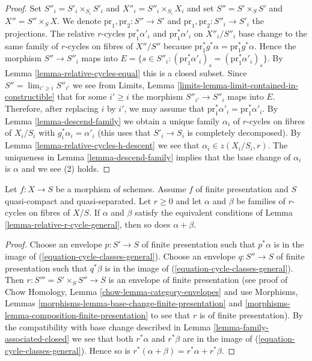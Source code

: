 \begin{proof}
\medskip\noindent
Set $S''_i = S'_i \times_{S_i} S'_i$ and $X''_i = S''_i \times_{S_i} X_i$
and set $S'' = S' \times_S S'$ and $X'' = S'' \times_S X$.
We denote $\text{pr}_1, \text{pr}_2 : S'' \to S'$ and
$\text{pr}_1, \text{pr}_2 : S''_i \to S'_i$ the projections.
The relative $r$-cycles $\text{pr}_1^*\alpha'_i$ and $\text{pr}_1^*\alpha'_i$
on $X''_i/S''_i$ base change to the same family of $r$-cycles
on fibres of $X''/S''$ because
$\text{pr}_1^*g^*\alpha = \text{pr}_1^*g^*\alpha$.
Hence the morphism $S'' \to S''_i$ maps into $E =
\{s \in S''_i : (\text{pr}_1^*\alpha'_i)_s = (\text{pr}_1^*\alpha'_i)_s\}$.
By Lemma \ref{lemma-relative-cycles-equal} this is a closed subset.
Since $S'' = \lim_{i' \geq i} S''_{i'}$ we see from
Limits, Lemma
\ref{limits-lemma-limit-contained-in-constructible}
that for some $i' \geq i$ the morphism $S''_{i'} \to S''_i$
maps into $E$. Therefore, after replacing $i$ by $i'$, we may assume that
$\text{pr}_1^*\alpha'_i = \text{pr}_1^*\alpha'_i$.
By Lemma \ref{lemma-descend-family}
we obtain a unique family $\alpha_i$
of $r$-cycles on fibres of $X_i/S_i$
with $g_i^*\alpha_i = \alpha'_i$ (this uses that $S'_i \to S_i$
is completely decomposed).
By Lemma \ref{lemma-relative-cycles-h-descent}
we see that $\alpha_i \in z(X_i/S_i, r)$.
The uniqueness in Lemma \ref{lemma-descend-family} implies that the
base change of $\alpha_i$ is $\alpha$ and we see (2) holds.
\end{proof}

\begin{lemma}
\label{lemma-add-relative-cycles-general}
Let $f : X \to S$ be a morphism of schemes. Assume $f$ of
finite presentation and $S$ quasi-compact and quasi-separated.
Let $r \geq 0$ and let $\alpha$ and $\beta$ be families of
$r$-cycles on fibres of $X/S$. If $\alpha$ and $\beta$ satisfy
the equivalent conditions of
Lemma \ref{lemma-relative-r-cycle-general}, then so does $\alpha + \beta$.
\end{lemma}

\begin{proof}
Choose an envelope $p : S' \to S$ of finite presentation
such that $p^*\alpha$ is in the image of
(\ref{equation-cycle-classes-general}). Choose an envelope
$q : S'' \to S$ of finite presentation such that $q^*\beta$
is in the image of (\ref{equation-cycle-classes-general}).
Then $r : S''' = S' \times_S S'' \to S$ is an envelope of
finite presentation (see proof of Chow Homology, Lemma
\ref{chow-lemma-category-envelopes}
and use Morphisms, Lemmas \ref{morphisms-lemma-base-change-finite-presentation}
and \ref{morphisms-lemma-composition-finite-presentation}
to see that $r$ is of finite presentation).
By the compatibility with base change described in
Lemma \ref{lemma-family-associated-closed}
we see that both $r^*\alpha$ and $r^*\beta$
are in the image of (\ref{equation-cycle-classes-general}).
Hence so is $r^*(\alpha + \beta) = r^*\alpha + r^*\beta$.
\end{proof}

